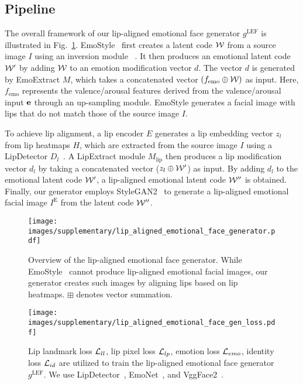 \subsection{Pipeline}
The overall framework of our lip-aligned emotional face generator $g^\text{LEF}$ is illustrated in Fig.~\ref{fig:pipeline of face generator}. EmoStyle~\cite{azari2024emostyle} first creates a latent code $\mathcal{W}$ from a source image $I$ using an inversion module ~\cite{azari2024emostyle,tov2021designing}. It then produces an emotional latent code $\mathcal{W}'$ by adding $\mathcal{W}$ to an emotion modification vector $d$. The vector $d$ is generated by EmoExtract $M$, which takes a concatenated vector $(f_\text{emo} \oplus \mathcal{W})$ as input. Here, $f_\text{emo}$ represents the valence/arousal features derived from the valence/arousal input $\mathbf{e}$ through an up-sampling module. EmoStyle generates a facial image with lips that do not match those of the source image $I$.

To achieve lip alignment, a lip encoder $E$ generates a lip embedding vector $z_l$ from lip heatmaps $H$, which are extracted from the source image $I$ using a LipDetector $D_l$~\cite{bulat2017far}. A LipExtract module $M_\text{lip}$ then produces a lip modification vector $d_l$ by taking a concatenated vector ($z_l \oplus \mathcal{W}'$) as input. By adding $d_l$ to the emotional latent code $\mathcal{W}'$, a lip-aligned emotional latent code $\mathcal{W}''$ is obtained. Finally, our generator employs StyleGAN2~\cite{karras2020analyzing} to generate a lip-aligned emotional facial image $I^\text{E}$ from the latent code $\mathcal{W}''$.

\begin{figure}
    \centering
    \texttt{[image: images/supplementary/lip\_aligned\_emotional\_face\_generator.pdf]}
    \caption{Overview of the lip-aligned emotional face generator. While EmoStyle~\cite{azari2024emostyle} cannot produce lip-aligned emotional facial images, our generator creates such images by aligning lips based on lip heatmaps. $\boxplus$ denotes vector summation.}
    \label{fig:pipeline of face generator}
\end{figure}

\begin{figure}
    \centering
    \texttt{[image: images/supplementary/lip\_aligned\_emotional\_face\_gen\_loss.pdf]}
    \caption{Lip landmark loss $\mathcal{L}_{ll}$, lip pixel loss $\mathcal{L}_{lp}$, emotion loss $\mathcal{L}_{emo}$, identity loss $\mathcal{L}_{id}$ are utilized to train the lip-aligned emotional face generator $g^\text{LEF}$. We use LipDetector~\cite{bulat2017far}, EmoNet~\cite{toisoul2021estimation}, and VggFace2~\cite{cao2018vggface2}.}
    \label{fig:pipeline of face gen loss}
\end{figure}

